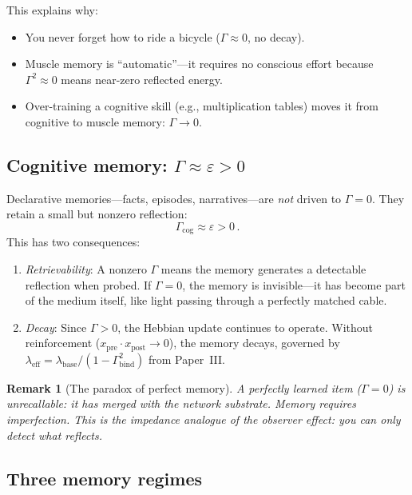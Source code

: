 \documentclass[aps,pre,twocolumn,superscriptaddress,floatfix]{revtex4-2}
\newtheorem{remark}{Remark}
\begin{document}
This explains why:
\begin{itemize}
  \item You never forget how to ride a bicycle
    ($\Gamma\approx 0$, no decay).
  \item Muscle memory is ``automatic''---it requires no
    conscious effort because $\Gamma^2\approx 0$ means
    near-zero reflected energy.
  \item Over-training a cognitive skill (e.g., multiplication
    tables) moves it from cognitive to muscle memory:
    $\Gamma\to 0$.
\end{itemize}

\subsection{Cognitive memory: $\Gamma\approx\varepsilon>0$}

Declarative memories---facts, episodes, narratives---are
\emph{not} driven to $\Gamma=0$.  They retain a small but
nonzero reflection:
\begin{equation}
  \Gamma_{\text{cog}} \approx \varepsilon > 0\,.
  \label{eq:cog-memory}
\end{equation}
This has two consequences:
\begin{enumerate}
  \item \emph{Retrievability}: A nonzero $\Gamma$ means the
    memory generates a detectable reflection when probed.
    If $\Gamma=0$, the memory is invisible---it has become
    part of the medium itself, like light passing through
    a perfectly matched cable.
  \item \emph{Decay}: Since $\Gamma>0$, the Hebbian update
    continues to operate.  Without reinforcement
    ($x_{\text{pre}}\cdot x_{\text{post}}\to 0$), the memory
    decays, governed by
    $\lambda_{\text{eff}}=\lambda_{\text{base}}/(1-\Gamma_{\text{bind}}^2)$
    from Paper~III.
\end{enumerate}

\begin{remark}[The paradox of perfect memory]
A perfectly learned item ($\Gamma=0$) is \emph{unrecallable}:
it has merged with the network substrate.
Memory requires imperfection.
This is the impedance analogue of the observer effect:
you can only detect what reflects.
\end{remark}

\subsection{Three memory regimes}
\end{document}
